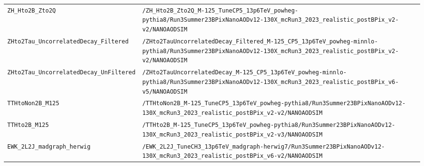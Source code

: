 \begin{longtable}{@{}>{\RaggedRight\arraybackslash}p{} >{\RaggedRight\arraybackslash}p{}@{}}
\texttt{ZH\_\allowbreak{}Hto2B\_\allowbreak{}Zto2Q} & \texttt{/\allowbreak{}ZH\_\allowbreak{}Hto2B\_\allowbreak{}Zto2Q\_\allowbreak{}M-\allowbreak{}125\_\allowbreak{}TuneCP5\_\allowbreak{}13p6TeV\_\allowbreak{}powheg-\allowbreak{}pythia8/\allowbreak{}Run3Summer23BPixNanoAODv12-\allowbreak{}130X\_\allowbreak{}mcRun3\_\allowbreak{}2023\_\allowbreak{}realistic\_\allowbreak{}postBPix\_\allowbreak{}v2-\allowbreak{}v2/\allowbreak{}NANOAODSIM} \\
\addlinespace[2pt]
\texttt{ZHto2Tau\_\allowbreak{}UncorrelatedDecay\_\allowbreak{}Filtered} & \texttt{/\allowbreak{}ZHto2TauUncorrelatedDecay\_\allowbreak{}Filtered\_\allowbreak{}M-\allowbreak{}125\_\allowbreak{}CP5\_\allowbreak{}13p6TeV\_\allowbreak{}powheg-\allowbreak{}minnlo-\allowbreak{}pythia8/\allowbreak{}Run3Summer23BPixNanoAODv12-\allowbreak{}130X\_\allowbreak{}mcRun3\_\allowbreak{}2023\_\allowbreak{}realistic\_\allowbreak{}postBPix\_\allowbreak{}v2-\allowbreak{}v2/\allowbreak{}NANOAODSIM} \\
\addlinespace[2pt]
\texttt{ZHto2Tau\_\allowbreak{}UncorrelatedDecay\_\allowbreak{}UnFiltered} & \texttt{/\allowbreak{}ZHto2TauUncorrelatedDecay\_\allowbreak{}M-\allowbreak{}125\_\allowbreak{}CP5\_\allowbreak{}13p6TeV\_\allowbreak{}powheg-\allowbreak{}minnlo-\allowbreak{}pythia8/\allowbreak{}Run3Summer23BPixNanoAODv12-\allowbreak{}130X\_\allowbreak{}mcRun3\_\allowbreak{}2023\_\allowbreak{}realistic\_\allowbreak{}postBPix\_\allowbreak{}v6-\allowbreak{}v5/\allowbreak{}NANOAODSIM} \\
\addlinespace[2pt]
\texttt{TTHtoNon2B\_\allowbreak{}M125} & \texttt{/\allowbreak{}TTHtoNon2B\_\allowbreak{}M-\allowbreak{}125\_\allowbreak{}TuneCP5\_\allowbreak{}13p6TeV\_\allowbreak{}powheg-\allowbreak{}pythia8/\allowbreak{}Run3Summer23BPixNanoAODv12-\allowbreak{}130X\_\allowbreak{}mcRun3\_\allowbreak{}2023\_\allowbreak{}realistic\_\allowbreak{}postBPix\_\allowbreak{}v2-\allowbreak{}v2/\allowbreak{}NANOAODSIM} \\
\addlinespace[2pt]
\texttt{TTHto2B\_\allowbreak{}M125} & \texttt{/\allowbreak{}TTHto2B\_\allowbreak{}M-\allowbreak{}125\_\allowbreak{}TuneCP5\_\allowbreak{}13p6TeV\_\allowbreak{}powheg-\allowbreak{}pythia8/\allowbreak{}Run3Summer23BPixNanoAODv12-\allowbreak{}130X\_\allowbreak{}mcRun3\_\allowbreak{}2023\_\allowbreak{}realistic\_\allowbreak{}postBPix\_\allowbreak{}v2-\allowbreak{}v3/\allowbreak{}NANOAODSIM} \\
\addlinespace[2pt]
\texttt{EWK\_\allowbreak{}2L2J\_\allowbreak{}madgraph\_\allowbreak{}herwig} & \texttt{/\allowbreak{}EWK\_\allowbreak{}2L2J\_\allowbreak{}TuneCH3\_\allowbreak{}13p6TeV\_\allowbreak{}madgraph-\allowbreak{}herwig7/\allowbreak{}Run3Summer23BPixNanoAODv12-\allowbreak{}130X\_\allowbreak{}mcRun3\_\allowbreak{}2023\_\allowbreak{}realistic\_\allowbreak{}postBPix\_\allowbreak{}v6-\allowbreak{}v2/\allowbreak{}NANOAODSIM} \\

\end{longtable}
